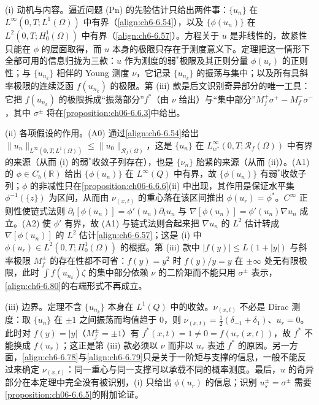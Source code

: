 \documentclass[../../main.tex]{subfiles}%
\begin{document}
\begin{remark}\label{remark:ch06-6.6.1}
(i) 动机与内容。逼近问题 (Pn) 的先验估计只给出两件事：$\{u_n\}$ 在 $L^\infty(0,T;L^1(\Omega))$ 中有界（\eqref{align:ch6-6.54}），以及 $\{\phi(u_n)\}$ 在 $L^2(0,T;H^1_0(\Omega))$ 中有界（\eqref{align:ch6-6.57}）。方程关于 $u$ 是非线性的，故紧性只能在 $\phi$ 的层面取得，而 $u$ 本身的极限只存在于测度意义下。定理把这一情形下全部可用的信息归拢为三款：$u$ 作为测度的弱$^*$极限及其正则分量 $\phi(u_r)$ 的正则性；与 $\{u_{n_k}\}$ 相伴的 Young 测度 $\nu$，它记录 $\{u_{n_k}\}$ 的振荡与集中；以及所有具斜率极限的连续泛函 $f(u_{n_k})$ 的极限。第 (iii) 款是后文识别奇异部分的唯一工具：它把 $f(u_{n_k})$ 的极限拆成“振荡部分”$f^*$（由 $\nu$ 给出）与“集中部分”$M^+_f\sigma^+-M^-_f\sigma^-$，其中 $\sigma^\pm$ 将在\cref{proposition:ch06-6.6.3}中给出。

(ii) 各项假设的作用。(A0) 通过\eqref{align:ch6-6.54}给出 $\|u_n\|_{L^\infty(0,T;L^1(\Omega))}\leqslant\|u_0\|_{\mathscr{R}_f(\Omega)}$，这是 $\{u_n\}$ 在 $L^\infty_{w^*}(0,T;\mathscr{R}_f(\Omega))$ 中有界的来源（从而 (i) 的弱$^*$收敛子列存在），也是 $\{\nu_n\}$ 胎紧的来源（从而 (ii)）。(A1) 的 $\phi\in C_b(\mathbb{R})$ 给出 $\{\phi(u_n)\}$ 在 $L^\infty(Q)$ 中有界，故 $\{\phi(u_n)\}$ 有弱$^*$收敛子列；$\phi$ 的非减性只在\cref{proposition:ch06-6.6.6}(ii) 中出现，其作用是保证水平集 $\phi^{-1}(\{z\})$ 为区间，从而由 $\nu_{(x,t)}$ 的重心落在该区间推出 $\phi(u_r)=\phi^*$。$C^\infty$ 正则性使链式法则 $\partial_t[\phi(u_n)]=\phi'(u_n)\partial_tu_n$ 与 $\nabla[\phi(u_n)]=\phi'(u_n)\nabla u_n$ 成立。(A2) 使 $\phi'$ 有界，故 (A1) 与链式法则合起来把 $\nabla u_n$ 的 $L^2$ 估计转成 $\nabla[\phi(u_n)]$ 的 $L^2$ 估计\eqref{align:ch6-6.57}；这是 (i) 中 $\phi(u_r)\in L^2(0,T;H^1_0(\Omega))$ 的根据。第 (iii) 款中 $|f(y)|\leqslant L(1+|y|)$ 与斜率极限 $M^\pm_f$ 的存在性都不可省：$f(y)=y^2$ 时 $f(y)/y=y$ 在 $\pm\infty$ 处无有限极限，此时 $\int f(u_{n_k})\zeta$ 的集中部分依赖 $\nu$ 的二阶矩而不能只用 $\sigma^\pm$ 表示，\eqref{align:ch6-6.80}的右端形式不再成立。

(iii) 边界。定理不含 $\{u_{n_k}\}$ 本身在 $L^1(Q)$ 中的收敛。$\nu_{(x,t)}$ 不必是 Dirac 测度：取 $\{u_n\}$ 在 $\pm1$ 之间振荡而均值趋于 $0$，则 $\nu_{(x,t)}=\frac12(\delta_{-1}+\delta_1)$、$u_r=0$。此时对 $f(y)=|y|$（$M^\pm_f=\pm1$）有 $f^*(x,t)=1\neq0=f(u_r(x,t))$，故 $f^*$ 不能换成 $f(u_r)$；这正是第 (iii) 款必须以 $\nu$ 而非以 $u_r$ 表述 $f^*$ 的原因。另一方面，\eqref{align:ch6-6.78}与\eqref{align:ch6-6.79}只是关于一阶矩与支撑的信息，一般不能反过来确定 $\nu_{(x,t)}$：同一重心与同一支撑可以承载不同的概率测度。最后，$u$ 的奇异部分在本定理中完全没有被识别，(i) 只给出 $\phi(u_r)$ 的信息；识别 $u_s^\pm=\sigma^\pm$ 需要\cref{proposition:ch06-6.6.5}的附加论证。
\end{remark}
\end{document}
